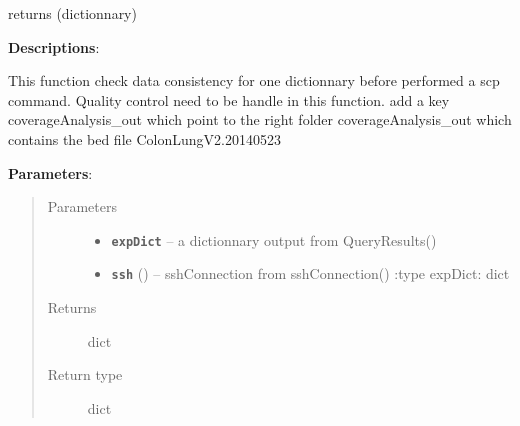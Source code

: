 \documentclass[letterpaper,10pt,english]{sphinxmanual}
\begin{document}
\begin{fulllineitems}
\label{datamanagerpkg:datamanagerpkg.ProtonCommunication_data_manager.CheckResConsistency}
returns (dictionnary)

\textbf{Descriptions}:

This function  check data consistency for one dictionnary before performed a scp command.
Quality control need to be handle in this function. add a key coverageAnalysis\_out
which point to the right folder coverageAnalysis\_out which contains the bed file ColonLungV2.20140523

\textbf{Parameters}:
\begin{quote}\begin{description}
\item[{Parameters}] \leavevmode\begin{itemize}
\item {} 
\textbf{\texttt{expDict}} -- a dictionnary output from QueryResults()

\item {} 
\textbf{\texttt{ssh}} ({\hyperref[datamanagerpkg:datamanagerpkg.ProtonCommunication_data_manager.sshConnection]{}}) -- sshConnection from sshConnection()
:type expDict: dict

\end{itemize}

\item[{Returns}] \leavevmode
dict

\item[{Return type}] \leavevmode
dict

\end{description}\end{quote}

\end{fulllineitems}

\end{document}
